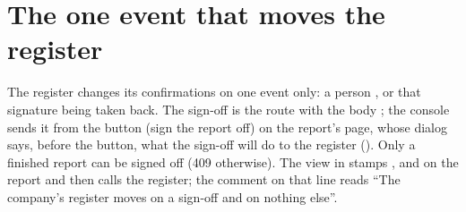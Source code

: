 \section{The one event that moves the register}\label{sec:register:event}

The register changes its confirmations on one event only: a person , or that signature being taken back. The sign-off is the route
 with the body ; the console
sends it from the button  (sign the report off) on the report's
page, whose dialog says, before the button, what the sign-off will do to the register
(). Only a finished report can be signed off (409
 otherwise). The view  in  stamps
,  and  on the report and then calls
the register; the comment on that line reads \enquote{The company's register moves on a
sign-off and on nothing else}.

